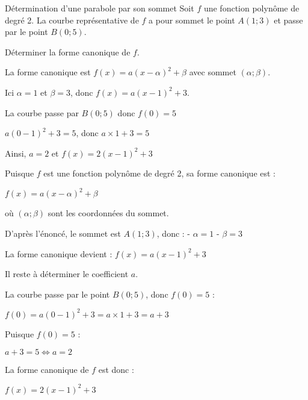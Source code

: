 \begin{EXO}{Détermination d'une parabole par son sommet}{}
Soit $f$ une fonction polynôme de degré 2. La courbe représentative de $f$ a pour sommet le point $A(1;3)$ et passe par le point $B(0;5)$. 

 Déterminer la forme canonique de $f$.

\begin{crep}
La forme canonique est $f(x) = a(x-\alpha)^2 + \beta$ avec sommet $(\alpha;\beta)$.

Ici $\alpha = 1$ et $\beta = 3$, donc $f(x) = a(x-1)^2 + 3$.

La courbe passe par $B(0;5)$ donc $f(0) = 5$

$a(0-1)^2 + 3 = 5$, donc $a \times 1 + 3 = 5$ 

Ainsi, $a = 2$ et $f(x) = 2(x-1)^2 + 3$
\end{crep}

\exocorrection

Puisque $f$ est une fonction polynôme de degré 2, sa forme canonique est :
\begin{center}$f(x) = a(x-\alpha)^2 + \beta$\end{center}

où $(\alpha;\beta)$ sont les coordonnées du sommet.

D'après l'énoncé, le sommet est $A(1;3)$, donc :
- $\alpha = 1$
- $\beta = 3$

La forme canonique devient : $f(x) = a(x-1)^2 + 3$

Il reste à déterminer le coefficient $a$. 

La courbe passe par le point $B(0;5)$, donc $f(0) = 5$ :

$f(0) = a(0-1)^2 + 3 = a \times 1 + 3 = a + 3$

Puisque $f(0) = 5$ :
\begin{center}$a + 3 = 5 \Leftrightarrow a = 2$\end{center}

La forme canonique de $f$ est donc : \begin{center}$f(x) = 2(x-1)^2 + 3$\end{center}
\end{EXO}